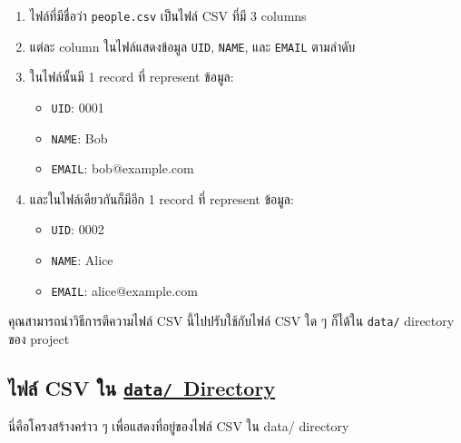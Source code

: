 \begin{enumerate}
    \item ไฟล์ที่มีชื่อว่า \texttt{people.csv} เป็นไฟล์ CSV ที่มี 3 columns
    \item แต่ละ column ในไฟล์แสดงข้อมูล \texttt{UID}, \texttt{NAME}, และ \texttt{EMAIL} ตามลำดับ
    \item ในไฟล์นั้นมี 1 record ที่ represent ข้อมูล:
        \begin{itemize}
            \item \texttt{UID}: 0001
            \item \texttt{NAME}: Bob
            \item \texttt{EMAIL}: bob@example.com
        \end{itemize}
    \item และในไฟล์เดียวกันก็มีอีก 1 record ที่ represent ข้อมูล:
        \begin{itemize}
            \item \texttt{UID}: 0002
            \item \texttt{NAME}: Alice
            \item \texttt{EMAIL}: alice@example.com
        \end{itemize}
\end{enumerate}

คุณสามารถนำวิธีการตีความไฟล์ CSV นี้ไปปรับใช้กับไฟล์ CSV ใด ๆ ก็ได้ใน \texttt{data/} directory ของ project

\pagebreak[4]

\subsection{ไฟล์ CSV ใน \href{https://github.com/CS211-651/project211-oakcoding/tree/9397d355461933fb007261e2ee97445ea93eacc1/data}{\texttt{data\slash}~Directory}}

นี่คือโครงสร้างคร่าว ๆ เพื่อแสดงที่อยู่ของไฟล์ CSV ใน data/ directory


